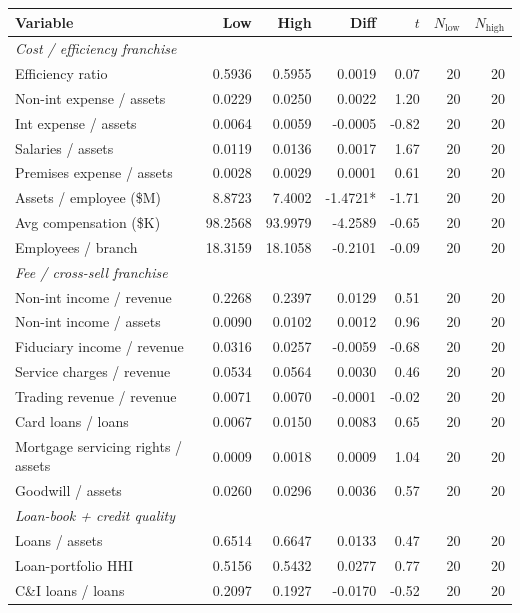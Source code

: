 \begin{tabular}{lrrrrrr}
\toprule
Variable & Low & High & Diff & $t$ & $N_{\text{low}}$ & $N_{\text{high}}$ \\
\midrule
\multicolumn{7}{l}{\emph{Cost / efficiency franchise}} \\
\midrule
Efficiency ratio & 0.5936 & 0.5955 & 0.0019 & 0.07 & 20 & 20 \\
Non-int expense / assets & 0.0229 & 0.0250 & 0.0022 & 1.20 & 20 & 20 \\
Int expense / assets & 0.0064 & 0.0059 & -0.0005 & -0.82 & 20 & 20 \\
Salaries / assets & 0.0119 & 0.0136 & 0.0017 & 1.67 & 20 & 20 \\
Premises expense / assets & 0.0028 & 0.0029 & 0.0001 & 0.61 & 20 & 20 \\
Assets / employee (\$M) & 8.8723 & 7.4002 & -1.4721* & -1.71 & 20 & 20 \\
Avg compensation (\$K) & 98.2568 & 93.9979 & -4.2589 & -0.65 & 20 & 20 \\
Employees / branch & 18.3159 & 18.1058 & -0.2101 & -0.09 & 20 & 20 \\
\midrule
\multicolumn{7}{l}{\emph{Fee / cross-sell franchise}} \\
\midrule
Non-int income / revenue & 0.2268 & 0.2397 & 0.0129 & 0.51 & 20 & 20 \\
Non-int income / assets & 0.0090 & 0.0102 & 0.0012 & 0.96 & 20 & 20 \\
Fiduciary income / revenue & 0.0316 & 0.0257 & -0.0059 & -0.68 & 20 & 20 \\
Service charges / revenue & 0.0534 & 0.0564 & 0.0030 & 0.46 & 20 & 20 \\
Trading revenue / revenue & 0.0071 & 0.0070 & -0.0001 & -0.02 & 20 & 20 \\
Card loans / loans & 0.0067 & 0.0150 & 0.0083 & 0.65 & 20 & 20 \\
Mortgage servicing rights / assets & 0.0009 & 0.0018 & 0.0009 & 1.04 & 20 & 20 \\
Goodwill / assets & 0.0260 & 0.0296 & 0.0036 & 0.57 & 20 & 20 \\
\midrule
\multicolumn{7}{l}{\emph{Loan-book + credit quality}} \\
\midrule
Loans / assets & 0.6514 & 0.6647 & 0.0133 & 0.47 & 20 & 20 \\
Loan-portfolio HHI & 0.5156 & 0.5432 & 0.0277 & 0.77 & 20 & 20 \\
C\&I loans / loans & 0.2097 & 0.1927 & -0.0170 & -0.52 & 20 & 20 \\

\end{tabular}

